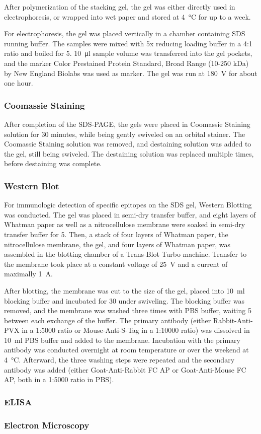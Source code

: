 After polymerization of the stacking gel, the gel was either directly used in electrophoresis, or wrapped into wet paper and stored at \SI{4}{\degreeCelsius} for up to a week. 

For electrophoresis, the gel was placed vertically in a chamber containing SDS running buffer. The samples were mixed with 5x reducing loading buffer in a 4:1 ratio and boiled for \SI{5}{\min}. \SI{10}{\micro\litre} sample volume was transferred into the gel pockets, and the marker Color Prestained Protein Standard, Broad Range (10-250 kDa) by New England Biolabs was used as marker. The gel was run at \SI{180}{\volt} for about one hour. 

\subsubsection{Coomassie Staining}
After completion of the SDS-PAGE, the gels were placed in Coomassie Staining solution for 30 minutes, while being gently swiveled on an orbital stainer. The Coomassie Staining solution was removed, and destaining solution was added to the gel, still being swiveled. The destaining solution was replaced multiple times, before destaining was complete. 

\subsubsection{Western Blot}
For immunologic detection of specific epitopes on the SDS gel, Western Blotting was conducted. The gel was placed in semi-dry transfer buffer, and eight layers of Whatman paper as well as a nitrocellulose membrane were soaked in semi-dry transfer buffer for \SI{5}{\min}. Then, a stack of four layers of Whatman paper, the nitrocellulose membrane, the gel, and four layers of Whatman paper, was assembled in the blotting chamber of a Trans-Blot\textsuperscript{\textregistered} Turbo\textsuperscript{\texttrademark} machine. Transfer to the membrane took place at a constant voltage of \SI{25}{\volt} and a current of maximally \SI{1}{\ampere}.

After blotting, the membrane was cut to the size of the gel, placed into \SI{10}{\milli\litre} blocking buffer and incubated for \SI{30}{\min} under swiveling. The blocking buffer was removed, and the membrane was washed three times with PBS buffer, waiting \SI{5}{\min} between each exchange of the buffer. The primary antibody (either Rabbit-Anti-PVX in a 1:5000 ratio or Mouse-Anti-S-Tag in a 1:10000 ratio) was dissolved in \SI{10}{\milli\litre} PBS buffer and added to the membrane. Incubation with the primary antibody was conducted overnight at room temperature or over the weekend at \SI{4}{\degreeCelsius}. Afterward, the three washing steps were repeated and the secondary antibody was added (either Goat-Anti-Rabbit FC AP or Goat-Anti-Mouse FC AP, both in a 1:5000 ratio in PBS). 
\subsubsection{ELISA}
\subsubsection{Electron Microscopy}